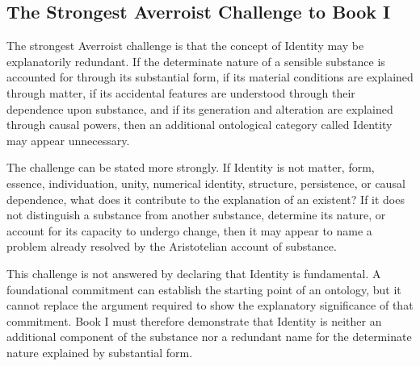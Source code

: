 
\subsection{The Strongest Averroist Challenge to Book I}
\label{subsec:ch08_s15_ss14}

\label{para:VS.B01.P01.C08.S15.SS14.P001}

The strongest Averroist challenge is that the
concept of Identity may be explanatorily
redundant. If the determinate nature of a
sensible substance is accounted for through
its substantial form, if its material conditions
are explained through matter, if its accidental
features are understood through their dependence
upon substance, and if its generation and
alteration are explained through causal powers,
then an additional ontological category called
Identity may appear unnecessary.

\label{para:VS.B01.P01.C08.S15.SS14.P002}

The challenge can be stated more strongly.
If Identity is not matter, form, essence,
individuation, unity, numerical identity,
structure, persistence, or causal dependence,
what does it contribute to the explanation
of an existent? If it does not distinguish
a substance from another substance, determine
its nature, or account for its capacity to
undergo change, then it may appear to name
a problem already resolved by the Aristotelian
account of substance.

\label{para:VS.B01.P01.C08.S15.SS14.P003}

This challenge is not answered by declaring
that Identity is fundamental. A foundational
commitment can establish the starting point
of an ontology, but it cannot replace the
argument required to show the explanatory
significance of that commitment. Book I
must therefore demonstrate that Identity
is neither an additional component of the
substance nor a redundant name for the
determinate nature explained by substantial
form.

\label{para:VS.B01.P01.C08.S15.SS14.P004}

